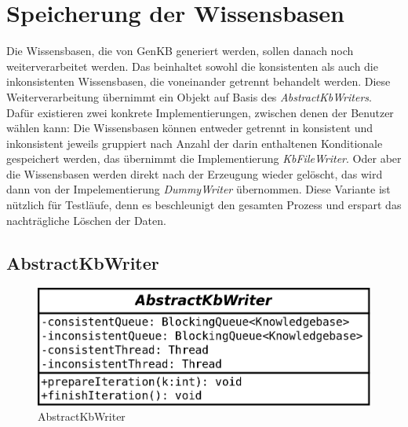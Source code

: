 \documentclass[12pt,a4paper]{article}
\begin{document}
\section{Speicherung der Wissensbasen}
Die Wissensbasen, die von GenKB generiert werden, sollen danach noch weiterverarbeitet werden. Das beinhaltet sowohl die konsistenten als auch die inkonsistenten Wissensbasen, die voneinander getrennt behandelt werden. Diese Weiterverarbeitung übernimmt ein Objekt auf Basis des \textit{AbstractKbWriters}. Dafür existieren zwei konkrete Implementierungen, zwischen denen der Benutzer wählen kann: Die Wissensbasen können entweder getrennt in konsistent und inkonsistent jeweils gruppiert nach Anzahl der darin enthaltenen Konditionale gespeichert werden, das übernimmt die Implementierung \textit{KbFileWriter}. Oder aber die Wissensbasen werden direkt nach der Erzeugung wieder gelöscht, das wird dann von der Impelementierung \textit{DummyWriter} übernommen. Diese Variante ist nützlich für Testläufe, denn es beschleunigt den gesamten Prozess und erspart das nachträgliche Löschen der Daten.
\subsection{AbstractKbWriter}

\begin{figure}
\includegraphics[width=0.45\linewidth]{bilder/AbstractKbWriter.png}
\caption{AbstractKbWriter}
\label{pic:abstractkbwriter}
\end{figure}
\end{document}
